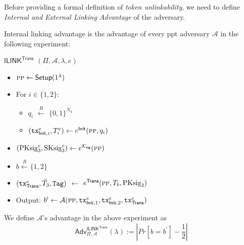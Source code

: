 Before providing a formal definition of \textit{token unlinkability}, we need to define \textit{Internal and External Linking Advantage} of the adversary.

\begin{definition}
            \label{def:Internal Linking Advantage}
            Internal linking advantage is the advantage of every \gls{ppt} adversary $\mathcal{A}$ in the following experiment:

            $\mathsf{ILINK}^\textsf{Trans}$  $(\Pi, \mathcal{A}, \lambda, e)$%
        \begin{itemize}
                \item [] $\textsc{pp} \leftarrow \textsf{Setup}(1^\lambda)$ 

                
                \item []  For $ i \in \{1, 2\}$:
                \begin{itemize}
                    \item [] $q_i$ $\xleftarrow{R}$ $\{0, 1\}^{N_q}$ 
                    \item [] $(\texttt{tx}_{\mathsf{Init}, i}^e, T_i^e) \leftarrow e^\textsf{Init}(\textsc{pp}, q_i)$
                \end{itemize}
                
                \item[] $(\text{PKsig}^e_3, \text{SKsig}^e_3) \leftarrow e^{\mathcal{K}_\mathsf{sig}}(\textsc{pp})  $ 
                \item[] $b \xleftarrow{R} \{1, 2\}$
                \item[] $(\texttt{tx}_\mathsf{Trans}^e, \Tilde{T}_3, \texttt{Tag})$ $\leftarrow$ $e^\mathsf{Trans}(\textsc{pp}, T_b, \text{PKsig}_3)$

                
                \item[] Output: $b^\prime \leftarrow \mathcal{A}(\textsc{pp},\texttt{tx}_{\mathsf{Init}, 1}^e, \texttt{tx}_{\mathsf{Init}, 2}^e, \texttt{tx}_\mathsf{Trans}^e)$
        \end{itemize}
We define $\mathcal{A}$'s advantage in the above experiment as
\begin{equation}
\label{eq:Adv_ILINK_Trans}
    \mathsf{Adv}^{\mathsf{ILINK}^\textsf{Trans}}_{\Pi, \mathcal{A}}(\lambda) := |Pr[b=b^\prime] - \frac{1}{2}|
\end{equation}


\end{definition}
